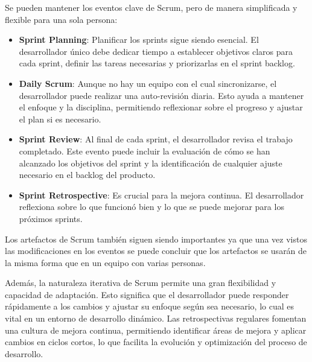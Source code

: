 Se pueden mantener los eventos clave de Scrum, pero de manera simplificada y flexible para una sola persona:
\begin{itemize}
    
    \item\textbf{Sprint Planning}: Planificar los sprints sigue siendo esencial. El desarrollador único debe dedicar tiempo a establecer objetivos claros para cada sprint, definir las tareas necesarias y priorizarlas en el sprint backlog.
    
    \item\textbf{Daily Scrum}: Aunque no hay un equipo con el cual sincronizarse, el desarrollador puede realizar una auto-revisión diaria. Esto ayuda a mantener el enfoque y la disciplina, permitiendo reflexionar sobre el progreso y ajustar el plan si es necesario.
    
    \item\textbf{Sprint Review}: Al final de cada sprint, el desarrollador revisa el trabajo completado. Este evento puede incluir la evaluación de cómo se han alcanzado los objetivos del sprint y la identificación de cualquier ajuste necesario en el backlog del producto.

    \item\textbf{Sprint Retrospective}: Es crucial para la mejora continua. El desarrollador reflexiona sobre lo que funcionó bien y lo que se puede mejorar para los próximos sprints.
  
\end{itemize}

Los artefactos de Scrum también siguen siendo importantes ya que una vez
vistos las modificaciones en los eventos se puede concluir que los artefactos se usarán de la misma forma que en un equipo con varias personas. 

Además, la naturaleza iterativa de Scrum permite una gran flexibilidad y
capacidad de adaptación. Esto significa que el desarrollador puede responder rápidamente a los cambios y ajustar su enfoque según sea necesario, lo cual es vital en un entorno de desarrollo dinámico. Las retrospectivas regulares fomentan una cultura de mejora continua, permitiendo identificar áreas de mejora y aplicar cambios en ciclos cortos, lo que facilita la evolución y optimización del proceso de desarrollo.

